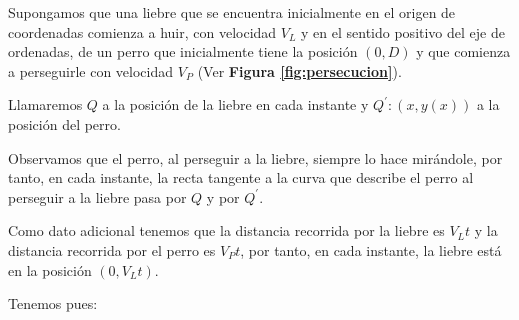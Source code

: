 \documentclass{mathnotes}
\begin{document}
\begin{example}
Supongamos que una liebre que se encuentra inicialmente en el origen de coordenadas comienza a huir, con velocidad $V_L$ y en el sentido positivo del eje de ordenadas, de un perro que inicialmente tiene la posición $(0,D)$ y que comienza a perseguirle con velocidad $V_P$ (Ver \textbf{Figura \ref{fig:persecucion}}).

Llamaremos $Q$ a la posición de la liebre en cada instante y $Q^\prime:(x,y(x))$ a la posición del perro.

Observamos que el perro, al perseguir a la liebre, siempre lo hace mirándole, por tanto, en cada instante, la recta tangente a la curva que describe el perro al perseguir a la liebre pasa por $Q$ y por $Q^\prime$.

Como dato adicional tenemos que la distancia recorrida por la liebre es $V_Lt$ y la distancia recorrida por el perro es $V_Pt$, por tanto, en cada instante, la liebre está en la posición $(0, V_Lt)$.

Tenemos pues:


\end{example}
\end{document}
